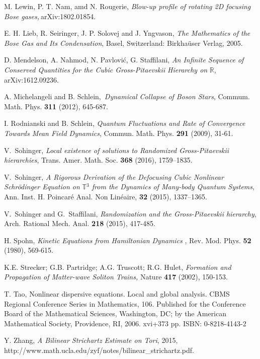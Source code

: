 \documentclass[12pt,letterpaper,leqno]{amsart}
\theoremstyle{plain}
\numberwithin{equation}{section}
\numberwithin{theorem}{section}
\numberwithin{proposition}{section}
\numberwithin{lemma}{section}
\numberwithin{corollary}{section}
\begin{document}
\begin{thebibliography}{99}
 M. Lewin, P. T. Nam, amd N. Rougerie, \emph{Blow-up
profile of rotating 2D focusing Bose gases,}$\ $arXiv:1802.01854.

 E. H. Lieb, R. Seiringer, J. P. Solovej and J. Yngvason, 
\emph{The Mathematics of the Bose Gas and Its Condensation}, Basel,
Switzerland: Birkha\"{u}ser Verlag, 2005.

 D. Mendelson, A. Nahmod, N. Pavlovi\'{c}, G. Staffilani, 
\emph{An Infinite Sequence of Conserved Quantities for the Cubic
Gross-Pitaevskii Hierarchy on }$\mathbb{R}$, arXiv:1612.09236.

 A. Michelangeli and B. Schlein,\emph{\
Dynamical Collapse of Boson Stars}, Commum. Math. Phys. \textbf{311} (2012),
645-687.

 I. Rodnianski and B. Schlein, \emph{Quantum
Fluctuations and Rate of Convergence Towards Mean Field Dynamics}, Commun.
Math. Phys. \textbf{291} (2009), 31-61.

 V.~{Sohinger}, \emph{Local existence of solutions to
Randomized Gross-Pitaevskii hierarchies}, Trans. Amer. Math. Soc. \textbf{368%
} (2016), 1759--1835.

 V.~{Sohinger}, \emph{{A Rigorous Derivation of the
Defocusing Cubic Nonlinear {S}chr\"{o}dinger Equation on }}$\mathbb{T}$\emph{%
{$^{3}$ from the Dynamics of Many-body Quantum Systems}}, Ann. Inst. H.
Poincar\'{e} Anal. Non Lin\'{e}aire, \textbf{32} (2015), 1337--1365.

 V.~{Sohinger} and G.~{Staffilani}, \emph{Randomization and
the Gross-Pitaevskii hierarchy}, Arch. Rational Mech. Anal. \textbf{218}
(2015), 417-485.

 H. Spohn, \emph{Kinetic Equations from Hamiltonian Dynamics}%
, Rev. Mod. Phys. \textbf{52} (1980), 569-615.

 K.E. Strecker; G.B. Partridge; A.G. Truscott; R.G. Hulet, 
\emph{Formation and Propagation of Matter-wave Soliton Trains, }Nature 
\textbf{417} (2002), 150-153.

 T. Tao, Nonlinear dispersive equations. Local and global
analysis. CBMS Regional Conference Series in Mathematics, 106. Published for
the Conference Board of the Mathematical Sciences, Washington, DC; by the
American Mathematical Society, Providence, RI, 2006. xvi+373 pp. ISBN:
0-8218-4143-2

 Y. Zhang, \emph{A Bilinear Strichartz Estimate on Tori}, 2015,
http://www.math.ucla.edu/\symbol{126}zyf/notes/bilinear\_strichartz.pdf.
\end{thebibliography}
\end{document}
